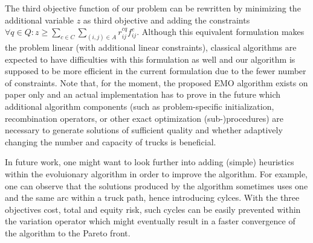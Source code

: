\documentclass[preprint,12pt]{elsarticle}
\newcommand{\COMMENTD}[1]{{\color{green}Dimo: #1}}
\begin{document}
The third objective function of our problem can be rewritten by minimizing the additional variable $z$ as third objective and adding the constraints $\forall q \in Q: z \geq \sum_{c \in C} \sum_{(i,j) \in A} r_{ij}^{cq} f_{ij}^c$. Although this equivalent formulation makes the problem linear (with additional linear constraints), classical algorithms are expected to have difficulties with this formulation as well and our algorithm is supposed to be more efficient in the current formulation due to the fewer number of constraints. Note that, for the moment, the proposed EMO algorithm exists on paper only and an actual implementation has to prove in the future which additional algorithm components (such as problem-specific initialization, recombination operators, or other exact optimization (sub-)procedures) are necessary to generate solutions of sufficient quality and whether adaptively changing the number and capacity of trucks is beneficial.


In future work, one might want to look further into adding (simple) heuristics within the evoluionary algorithm in order to improve the algorithm. For example, one can observe that the solutions produced by the algorithm sometimes uses one and the same arc within a truck path, hence introducing cylces. With the three objectives cost, total and equity risk, such cycles can be easily prevented within the variation operator which might eventually result in a faster convergence of the algorithm to the Pareto front.





% 
\end{document}
